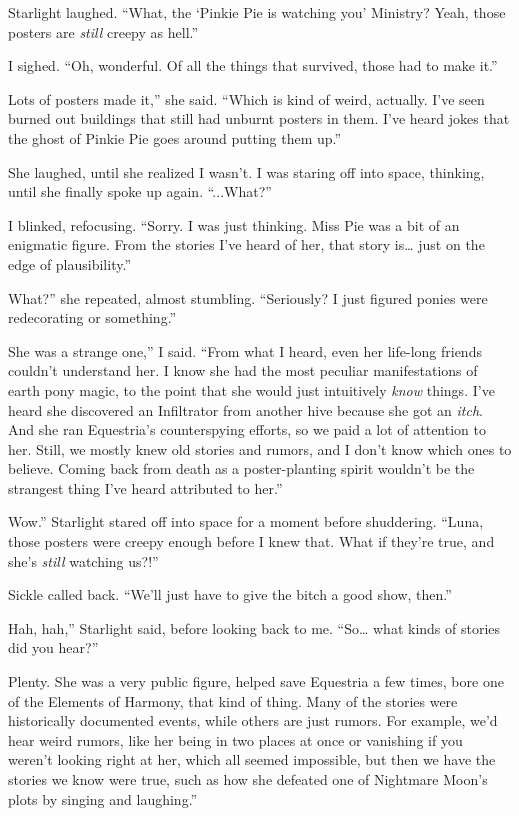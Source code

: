 Starlight laughed. “What, the ‘Pinkie Pie is watching you’ Ministry? Yeah, those posters are \textit{still} creepy as hell.”

I sighed. “Oh, wonderful. Of all the things that survived, those had to make it.”

\leavevmode{}Lots of posters made it,” she said. “Which is kind of weird, actually. I’ve seen burned out buildings that still had unburnt posters in them. I’ve heard jokes that the ghost of Pinkie Pie goes around putting them up.”

She laughed, until she realized I wasn’t. I was staring off into space, thinking, until she finally spoke up again. “...What?”

I blinked, refocusing. “Sorry. I was just thinking. Miss Pie was a bit of an enigmatic figure. From the stories I’ve heard of her, that story is… just on the edge of plausibility.”

\leavevmode{}What?” she repeated, almost stumbling. “Seriously? I just figured ponies were redecorating or something.”

\leavevmode{}She was a strange one,” I said. “From what I heard, even her life-long friends couldn’t understand her. I know she had the most peculiar manifestations of earth pony magic, to the point that she would just intuitively \textit{know} things. I’ve heard she discovered an Infiltrator from another hive because she got an \textit{itch}. And she ran Equestria’s counterspying efforts, so we paid a lot of attention to her. Still, we mostly knew old stories and rumors, and I don’t know which ones to believe. Coming back from death as a poster-planting spirit wouldn’t be the strangest thing I’ve heard attributed to her.”

\leavevmode{}Wow.” Starlight stared off into space for a moment before shuddering. “Luna, those posters were creepy enough before I knew that. What if they’re true, and she’s \textit{still} watching us?!”

Sickle called back. “We’ll just have to give the bitch a good show, then.”

\leavevmode{}Hah, hah,” Starlight said, before looking back to me. “So… what kinds of stories did you hear?”

\leavevmode{}Plenty. She was a very public figure, helped save Equestria a few times, bore one of the Elements of Harmony, that kind of thing. Many of the stories were historically documented events, while others are just rumors. For example, we’d hear weird rumors, like her being in two places at once or vanishing if you weren’t looking right at her, which all seemed impossible, but then we have the stories we know were true, such as how she defeated one of Nightmare Moon’s plots by singing and laughing.”

